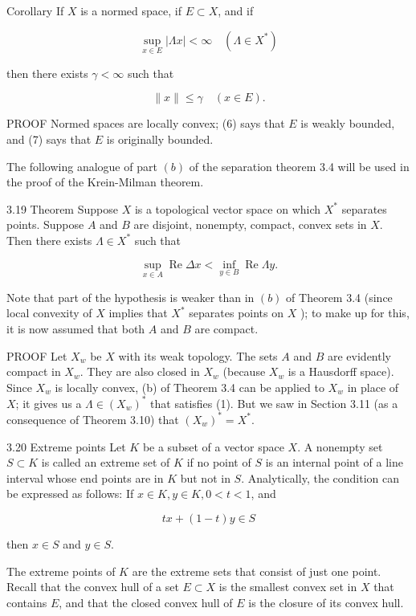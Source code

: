 \documentclass[10pt]{article}
\begin{document}
Corollary If $X$ is a normed space, if $E \subset X$, and if

$$
\sup _{x \in E}|\Lambda x|<\infty \quad\left(\Lambda \in X^{*}\right)
$$

then there exists $\gamma<\infty$ such that

$$
\|x\| \leq \gamma \quad(x \in E) .
$$

PROOF Normed spaces are locally convex; (6) says that $E$ is weakly bounded, and (7) says that $E$ is originally bounded.

The following analogue of part $(b)$ of the separation theorem 3.4 will be used in the proof of the Krein-Milman theorem.

3.19 Theorem Suppose $X$ is a topological vector space on which $X^{*}$ separates points. Suppose $A$ and $B$ are disjoint, nonempty, compact, convex sets in $X$. Then there exists $\Lambda \in X^{*}$ such that

$$
\sup _{x \in A} \operatorname{Re} \Delta x<\inf _{y \in B} \operatorname{Re} \Lambda y .
$$

Note that part of the hypothesis is weaker than in $(b)$ of Theorem 3.4 (since local convexity of $X$ implies that $X^{*}$ separates points on $X$ ); to make up for this, it is now assumed that both $A$ and $B$ are compact.

PROOF Let $X_{w}$ be $X$ with its weak topology. The sets $A$ and $B$ are evidently compact in $X_{w}$. They are also closed in $X_{w}$ (because $X_{w}$ is a Hausdorff space). Since $X_{w}$ is locally convex, (b) of Theorem 3.4 can be applied to $X_{w}$ in place of $X$; it gives us a $\Lambda \in\left(X_{w}\right)^{*}$ that satisfies (1). But we saw in Section 3.11 (as a consequence of Theorem 3.10) that $\left(X_{w}\right)^{*}=X^{*}$.

3.20 Extreme points Let $K$ be a subset of a vector space $X$. A nonempty set $S \subset K$ is called an extreme set of $K$ if no point of $S$ is an internal point of a line interval whose end points are in $K$ but not in $S$. Analytically, the condition can be expressed as follows: If $x \in K, y \in K, 0<t<1$, and

$$
t x+(1-t) y \in S
$$

then $x \in S$ and $y \in S$.

The extreme points of $K$ are the extreme sets that consist of just one point. Recall that the convex hull of a set $E \subset X$ is the smallest convex set in $X$ that contains $E$, and that the closed convex hull of $E$ is the closure of its convex hull.
\end{document}
